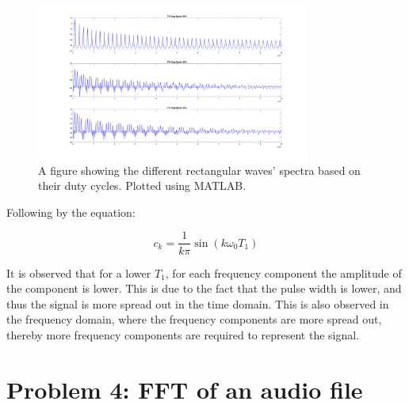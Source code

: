 \begin{figure}[H]
    \centering
    \includegraphics[width=0.8\textwidth]{images/prelab_problem_3_freq.png}
    \caption{A figure showing the different rectangular waves' spectra based on their duty cycles. Plotted using MATLAB.}
\end{figure}
Following by the equation:

\begin{equation}
    c_k = \frac{1}{k\pi}\sin(k\omega_0T_1)
\end{equation}

It is observed that for a lower $T_1$, for each frequency component the amplitude of the component is lower. This is due to the fact that the pulse width is lower, and thus the signal is more spread out in the time domain. This is also observed in the frequency domain, where the frequency components are more spread out, thereby more frequency components are required to represent the signal.

\section{Problem 4: FFT of an audio file}

